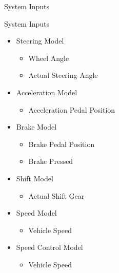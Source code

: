\documentclass{beamer}
\begin{document}
\begin{frame}
\begin{minipage}[t]{0.48\linewidth}
\begin{block}{System Inputs}
	\end{block}
\end{minipage}%
\hfill%
\begin{minipage}[t]{0.48\linewidth}
\begin{block}{System Inputs}
		\begin{itemize}
			\tiny
		    \item Steering Model
		    \begin{itemize}
		    \tiny
		    		\item Wheel Angle
		    		\item Actual Steering Angle
		    \end{itemize}
		    \item Acceleration Model
		    \begin{itemize}
		    \tiny
		    		\item Acceleration Pedal Position
		    \end{itemize}
		    \item Brake Model
		    \begin{itemize}
		    \tiny
		    		\item Brake Pedal Position
		    		\item Brake Pressed
		    \end{itemize}
		    \item Shift Model
		    \begin{itemize}
		    \tiny
		    		\item Actual Shift Gear
		    \end{itemize}
		    \item Speed Model
		    \begin{itemize}
		    \tiny
		    		\item Vehicle Speed
		    \end{itemize}
		    \item Speed Control Model
		    \begin{itemize}
		    \tiny
		    		\item Vehicle Speed
		    \end{itemize}
		\end{itemize}
	\end{block}
\end{minipage}
\end{frame}
\end{document}
